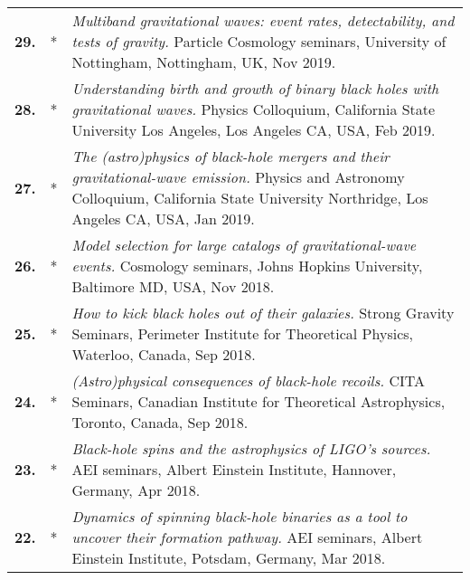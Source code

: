 \documentclass[a4paper]{moderncv}
\begin{document}
{\begin{longtable}{rp{0.4cm}p{15.8cm}}
\textbf{29.} & *& \textit{Multiband gravitational waves: event rates, detectability, and tests of gravity.}
\newline{} 
%
Particle Cosmology seminars, University of Nottingham, Nottingham, UK, Nov 2019.
\vspace{0.05cm}\\
\textbf{28.} & *& \textit{Understanding birth and growth of binary black holes with gravitational waves.}
\newline{} 
Physics Colloquium, California State University Los Angeles, Los Angeles CA, USA, Feb 2019.
\vspace{0.05cm}\\
%
\textbf{27.} & *& \textit{The (astro)physics of black-hole mergers and their gravitational-wave emission.}
\newline{} 
Physics and Astronomy Colloquium, California State University Northridge, Los Angeles CA, USA, Jan 2019.
\vspace{0.05cm}\\
%
\textbf{26.} & *& \textit{Model selection for large catalogs of gravitational-wave events.}
\newline{} 
Cosmology seminars, Johns Hopkins University, Baltimore MD, USA, Nov 2018.
\vspace{0.05cm}\\
%
\textbf{25.} & *& \textit{How to kick black holes out of their galaxies.}
\newline{} 
Strong Gravity Seminars, Perimeter Institute for Theoretical Physics, Waterloo, Canada, Sep 2018.
\vspace{0.05cm}\\
%
\textbf{24.} & *& \textit{(Astro)physical consequences of black-hole recoils.}
\newline{} 
CITA Seminars, Canadian Institute for Theoretical Astrophysics, Toronto, Canada, Sep 2018.
\vspace{0.05cm}\\
%
\textbf{23.} & *& \textit{Black-hole spins and the astrophysics of LIGO's sources.}
\newline{} 
AEI seminars, Albert Einstein Institute, Hannover, Germany, Apr 2018.
\vspace{0.05cm}\\
%
\textbf{22.} & *& \textit{Dynamics of spinning black-hole binaries as a tool to uncover their formation pathway.}
\newline{} 
AEI seminars, Albert Einstein Institute, Potsdam, Germany, Mar 2018.
\vspace{0.05cm}\\

\end{longtable}}
\end{document}
